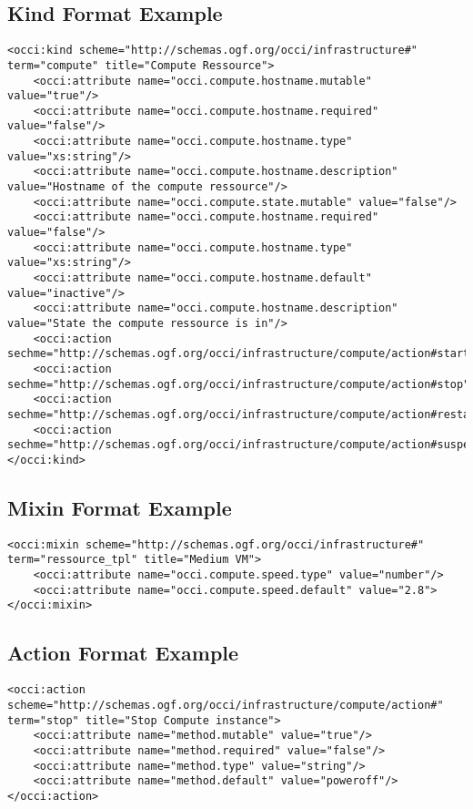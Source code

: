 \documentclass[10pt,a4paper]{article}
\begin{document}
\subsection{Kind Format Example}
\label{sec:example_kind}
\begin{lstlisting}
<occi:kind scheme="http://schemas.ogf.org/occi/infrastructure#" term="compute" title="Compute Ressource">
	<occi:attribute name="occi.compute.hostname.mutable" value="true"/>
	<occi:attribute name="occi.compute.hostname.required" value="false"/>
	<occi:attribute name="occi.compute.hostname.type" value="xs:string"/>
	<occi:attribute name="occi.compute.hostname.description" value="Hostname of the compute ressource"/>
	<occi:attribute name="occi.compute.state.mutable" value="false"/>
	<occi:attribute name="occi.compute.hostname.required" value="false"/>
	<occi:attribute name="occi.compute.hostname.type" value="xs:string"/>
	<occi:attribute name="occi.compute.hostname.default" value="inactive"/>
	<occi:attribute name="occi.compute.hostname.description" value="State the compute ressource is in"/>
	<occi:action sechme="http://schemas.ogf.org/occi/infrastructure/compute/action#start"/>
	<occi:action sechme="http://schemas.ogf.org/occi/infrastructure/compute/action#stop"/>
	<occi:action sechme="http://schemas.ogf.org/occi/infrastructure/compute/action#restart"/>
	<occi:action sechme="http://schemas.ogf.org/occi/infrastructure/compute/action#suspend"/>
</occi:kind>
\end{lstlisting}

\subsection{Mixin Format Example}
\label{sec:example_mixin}

\begin{lstlisting}
<occi:mixin scheme="http://schemas.ogf.org/occi/infrastructure#" term="ressource_tpl" title="Medium VM">
	<occi:attribute name="occi.compute.speed.type" value="number"/>
	<occi:attribute name="occi.compute.speed.default" value="2.8">		
</occi:mixin>
\end{lstlisting}

\subsection{Action Format Example}
\label{sec:example_action} 

\begin{lstlisting}
<occi:action scheme="http://schemas.ogf.org/occi/infrastructure/compute/action#" term="stop" title="Stop Compute instance">
	<occi:attribute name="method.mutable" value="true"/>
	<occi:attribute name="method.required" value="false"/>
	<occi:attribute name="method.type" value="string"/>
	<occi:attribute name="method.default" value="poweroff"/>
</occi:action>
\end{lstlisting}
\end{document}
